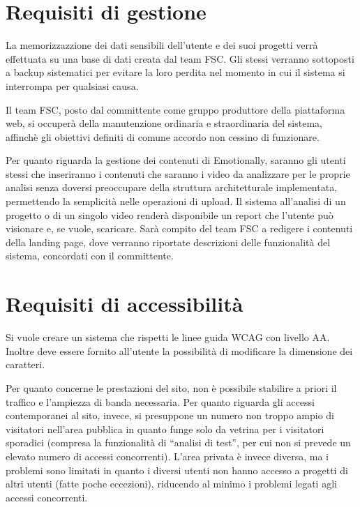 \section{Requisiti di gestione}\label{sec:requisiti-di-gestione}
La memorizzazzione dei dati sensibili dell'utente e dei suoi progetti verrà 
effettuata su una base di dati creata dal team FSC. Gli stessi verranno 
sottoposti a backup sistematici per evitare la loro perdita nel momento in cui 
il sistema si interrompa per qualsiasi causa.

Il team FSC, posto dal committente come gruppo produttore della piattaforma 
web, si occuperà della manutenzione ordinaria e straordinaria del sistema, 
affinchè gli obiettivi definiti di comune accordo non cessino di funzionare.

Per quanto riguarda la gestione dei contenuti di Emotionally, saranno gli 
utenti stessi che inseriranno i contenuti che saranno i video da analizzare per 
le proprie analisi senza doversi preoccupare della struttura architetturale 
implementata, permettendo la semplicità nelle operazioni di upload. Il sistema 
all'analisi di un progetto o di un singolo video renderà disponibile un report 
che l'utente può visionare e, se vuole, scaricare. 
Sarà compito del team FSC a redigere i contenuti della landing page, dove 
verranno riportate descrizioni delle funzionalità del sistema, concordati con 
il committente.

\section{Requisiti di accessibilità}\label{sec:requisiti-di-accessibilita}
Si vuole creare un sistema che rispetti le linee guida WCAG con livello AA. 
Inoltre deve essere fornito all'utente la possibilità di modificare la 
dimensione dei caratteri.

Per quanto concerne le prestazioni del sito, non è possibile stabilire a priori 
il traffico e l'ampiezza di banda necessaria. Per quanto riguarda gli accessi 
contemporanei al sito, invece, si presuppone un numero non troppo ampio di 
visitatori nell'area pubblica in quanto funge solo da vetrina per i visitatori 
sporadici (compresa la funzionalità di ``analisi di test'', per cui non si 
prevede un elevato numero di accessi concorrenti). L'area privata è invece 
diversa, ma i problemi sono limitati in quanto i diversi utenti non hanno 
accesso a progetti di altri utenti (fatte poche eccezioni), riducendo al minimo 
i problemi legati agli accessi concorrenti.

